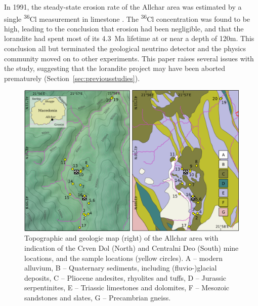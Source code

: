 \documentclass[titlepage]{article}
\begin{document}
In 1991, the steady-state erosion rate of the Allchar area was
estimated by a single \textsuperscript{36}Cl measurement in limestone
\citep{dockhorn1991}. The \textsuperscript{36}Cl concentration was
found to be high, leading to the conclusion that erosion had been
negligible, and that the lorandite had spent most of its 4.3~Ma
lifetime at or near a depth of 120m. This conclusion all but
terminated the geological neutrino detector and the physics community
moved on to other experiments. This paper raises several issues with
the \citet{dockhorn1991} study, suggesting that the lorandite project
may have been aborted prematurely
(Section~\ref{sec:previousstudies}).

\begin{figure}[!ht]
  \centering
  \includegraphics[width=\textwidth]{maps.png}
  \caption{Topographic \citep[left,][]{jarvis2008} and geologic map
    (right) of the Allchar area with indication of the Crven Dol
    (North) and Centralni Deo (South) mine locations, and the sample
    locations (yellow circles). A -- modern alluvium, B -- Quaternary
    sediments, including (fluvio-)glacial deposits, C -- Pliocene
    andesites, rhyolites and tuffs, D -- Jurassic serpentinites, E --
    Triassic limestones and dolomites, F -- Mesozoic sandstones and
    slates, G -- Precambrian gneiss.}
  \label{fig:maps}
\end{figure}
\end{document}
